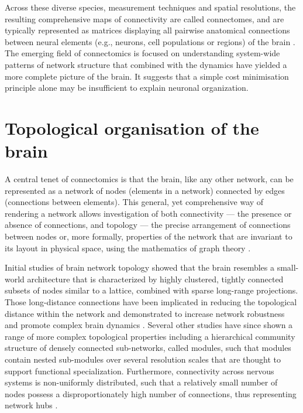 Across these diverse species, measurement techniques and spatial resolutions, the resulting comprehensive maps of connectivity are called connectomes, and are typically represented as matrices displaying all pairwise anatomical connections between neural elements (e.g., neurons, cell populations or regions) of the brain \citep{Sporns2005}. The emerging field of connectomics is focused on understanding system-wide patterns of network structure that combined with the dynamics have yielded a more complete picture of the brain. It suggests that a simple cost minimisation principle alone may be insufficient to explain neuronal organization.

\section{Topological organisation of the brain}

A central tenet of connectomics is that the brain, like any other network, can be represented as a network of nodes (elements in a network) connected by edges (connections between elements). This general, yet comprehensive way of rendering a network allows investigation of both connectivity --- the presence or absence of connections, and topology --- the precise arrangement of connections between nodes or, more formally, properties of the network that are invariant to its layout in physical space, using the mathematics of graph theory \citep{Barabasi2016}.

Initial studies of brain network topology showed that the brain resembles a small-world architecture \citep{Bassett2006,Gygi1999,Hilgetag2004,Sporns2004,Watts1998} that is characterized by highly clustered, tightly connected subsets of nodes similar to a lattice, combined with sparse long-range projections. Those long-distance connections have been implicated in reducing the topological distance within the network \mbox{\citep{Bullmore2012,Sporns2004,VandenHeuvel2011}} and demonstrated to increase network robustness and promote complex brain dynamics \citep{Betzel2018}. Several other studies have since shown a range of more complex topological properties including a hierarchical community structure of densely connected sub-networks, called modules, such that modules contain nested sub-modules over several resolution scales \citep{Bullmore1997,Meunier2010a,Towlson2013} that are thought to support functional specialization. Furthermore, connectivity across nervous systems is non-uniformly distributed, such that a relatively small number of nodes possess a disproportionately high number of connections, thus representing network hubs \mbox{\citep{Towlson2013,VandenHeuvel2011}}.

